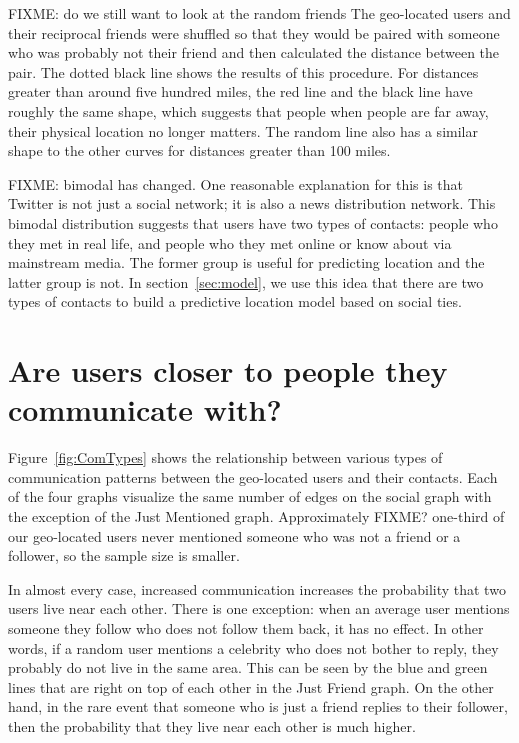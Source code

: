 FIXME: do we still want to look at the random friends
The geo-located users and their reciprocal friends were shuffled so that they
would be paired with someone who was probably not their friend and then
calculated the distance between the pair.
The dotted black line shows the results of this procedure.
For distances greater than around five
hundred miles, the red line and the black line have roughly the same shape,
which suggests that people when people are far away, their physical location no
longer matters.
The random line also has a similar shape to the other curves for distances
greater than 100 miles.

FIXME: bimodal has changed.
One reasonable explanation for this is that Twitter is not just a social
network; it is also a news distribution network.  This bimodal distribution
suggests that users have two types of contacts: people who they met in
real life, and people who they met online or know about via mainstream media.
The former group is useful for predicting location and the latter group is not.
In section~\ref{sec:model}, we use this idea that there are two types of
contacts to build a predictive location model based on social ties.


\section{Are users closer to people they communicate with?}

Figure~\ref{fig:ComTypes} shows the relationship between various types of
communication patterns between the geo-located users and their contacts.
Each of the four graphs visualize the same number of edges on the social graph
with the exception of the Just Mentioned graph. Approximately FIXME? one-third of our
geo-located users never mentioned someone who was not a friend or a follower,
so the sample size is smaller.

In almost every case, increased communication increases the probability that
two users live near each other.
There is one exception: when an average user mentions someone they follow who
does not follow them back, it has no effect.
In other words, if a random user mentions a celebrity who does not bother to
reply, they probably do not live in the same area. This can be seen by the blue
and green lines that are right on top of each other in the Just Friend graph.
On the other hand, in the rare event that someone who is just a friend replies
to their follower, then the probability that they live near each other is much
higher.

